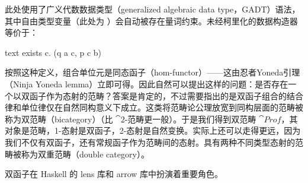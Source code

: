 此处使用了广义代数数据类型（generalized algebraic data type，GADT）语法，其中自由类型变量（此处为 ）会自动被存在量词约束。未经柯里化的数据构造器  等价于：

\begin{snip}{text}
exists c. (q a c, p c b)
\end{snip}
按照这种定义，组合单位元是同态函子（hom-functor）——这由忍者Yoneda引理（Ninja Yoneda lemma）立即可得。因此自然可以提出这样的问题：是否存在一个以双函子作为态射的范畴？答案是肯定的，不过需要指出的是双函子组合的结合律和单位律仅在自然同构意义下成立。这类将范畴论公理放宽到同构层面的范畴被称为双范畴（bicategory）（比 $\cat{2}$-范畴更一般）。于是我们得到双范畴 $\cat{Prof}$，其对象是范畴，1-态射是双函子，2-态射是自然变换。实际上还可以走得更远，因为我们不仅有双函子，还有常规函子作为范畴间的态射。具有两种不同类型态射的范畴被称为双重范畴（double category）。

双函子在 Haskell 的 lens 库和 arrow 库中扮演着重要角色。